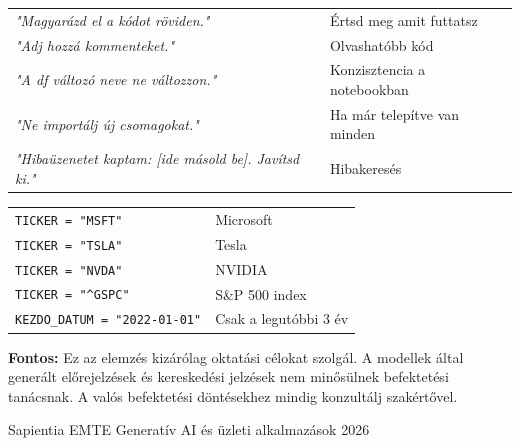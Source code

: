 \documentclass[11pt,a4paper]{article}
\begin{document}
\smallskip

\begin{tcolorbox}[cheatstyle, title={Hasznos prompt kiegészítések kódgeneráláshoz}]
\begin{tabularx}{\linewidth}{@{}lX@{}}
\textit{"Magyarázd el a kódot röviden."} & Értsd meg amit futtatsz \\[3pt]
\textit{"Adj hozzá kommenteket."} & Olvashatóbb kód \\[3pt]
\textit{"A df változó neve ne változzon."} & Konzisztencia a notebookban \\[3pt]
\textit{"Ne importálj új csomagokat."} & Ha már telepítve van minden \\[3pt]
\textit{"Hibaüzenetet kaptam: [ide másold be]. Javítsd ki."} & Hibakeresés \\
\end{tabularx}
\end{tcolorbox}

\smallskip

\begin{tcolorbox}[cheatstyle, title={Notebook paraméterek -- gyors változtatás}]
\begin{tabular}{@{}ll@{}}
\texttt{TICKER = "MSFT"}        & Microsoft \\[2pt]
\texttt{TICKER = "TSLA"}        & Tesla \\[2pt]
\texttt{TICKER = "NVDA"}        & NVIDIA \\[2pt]
\texttt{TICKER = "\^{}GSPC"}    & S\&P 500 index \\[2pt]
\texttt{KEZDO\_DATUM = "2022-01-01"} & Csak a legutóbbi 3 év \\
\end{tabular}
\end{tcolorbox}

\smallskip

\begin{tcolorbox}[warnstyle]
\textbf{\textcolor{warnborder}{Fontos:}}
Ez az elemzés kizárólag oktatási célokat szolgál.
A modellek által generált előrejelzések és kereskedési jelzések
nem minősülnek befektetési tanácsnak.
A valós befektetési döntésekhez mindig konzultálj szakértővel.
\end{tcolorbox}

\vfill
\begin{center}
\small\textcolor{medgray}{Sapientia EMTE \textbullet{} Generatív AI és üzleti alkalmazások \textbullet{} 2026}
\end{center}
\end{document}
